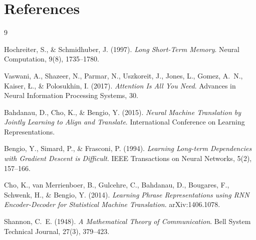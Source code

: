 \section*{References}

\begin{thebibliography}{9}

Hochreiter, S., \& Schmidhuber, J. (1997).
\textit{Long Short-Term Memory}.
Neural Computation, 9(8), 1735--1780.

Vaswani, A., Shazeer, N., Parmar, N., Uszkoreit, J., Jones, L., Gomez, A.~N.,
Kaiser, \L., \& Polosukhin, I. (2017).
\textit{Attention Is All You Need}.
Advances in Neural Information Processing Systems, 30.

Bahdanau, D., Cho, K., \& Bengio, Y. (2015).
\textit{Neural Machine Translation by Jointly Learning to Align and Translate}.
International Conference on Learning Representations.

Bengio, Y., Simard, P., \& Frasconi, P. (1994).
\textit{Learning Long-term Dependencies with Gradient Descent is Difficult}.
IEEE Transactions on Neural Networks, 5(2), 157--166.

Cho, K., van Merrienboer, B., Gulcehre, C., Bahdanau, D., Bougares, F.,
Schwenk, H., \& Bengio, Y. (2014).
\textit{Learning Phrase Representations using RNN Encoder-Decoder for
Statistical Machine Translation}.
arXiv:1406.1078.

Shannon, C.~E. (1948).
\textit{A Mathematical Theory of Communication}.
Bell System Technical Journal, 27(3), 379--423.

\end{thebibliography}
